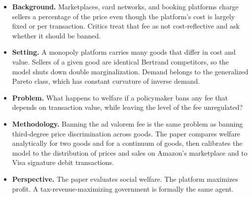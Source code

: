 \documentclass[11pt]{article}
\begin{document}
\begin{itemize}
    \item \textbf{Background.}
    Marketplaces, card networks, and booking platforms charge sellers a
    percentage of the price even though the platform's cost is largely fixed
    or per transaction.  Critics treat that fee as not cost-reflective and
    ask whether it should be banned.

    \item \textbf{Setting.}
    A monopoly platform carries many goods that differ in cost and value.
    Sellers of a given good are identical Bertrand competitors, so the model
    shuts down double marginalization.  Demand belongs to the generalized
    Pareto class, which has constant curvature of inverse demand.

    \item \textbf{Problem.}
    What happens to welfare if a policymaker bans any fee that depends on
    transaction value, while leaving the level of the fee unregulated?

    \item \textbf{Methodology.}
    Banning the ad valorem fee is the same problem as banning third-degree
    price discrimination across goods.  The paper compares welfare
    analytically for two goods and for a continuum of goods, then calibrates
    the model to the distribution of prices and sales on Amazon's marketplace
    and to Visa signature debit transactions.

    \item \textbf{Perspective.}
    The paper evaluates social welfare.  The platform maximizes profit.  A
    tax-revenue-maximizing government is formally the same agent.


\end{itemize}
\end{document}
